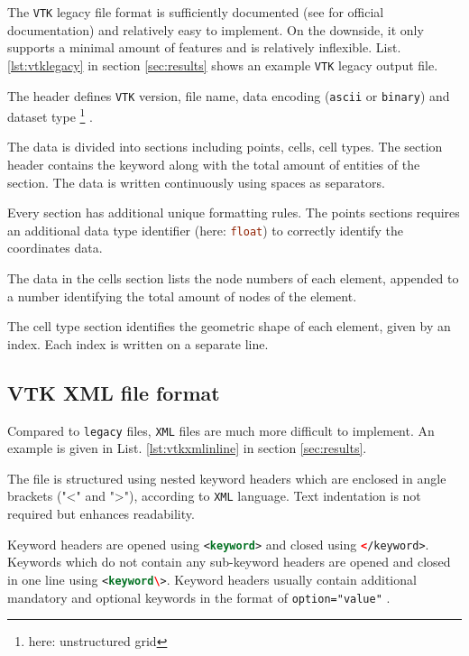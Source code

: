 The \texttt{VTK} legacy file format is sufficiently documented (see \cite{Kit} for official documentation) and relatively easy to implement. On the downside, it only supports a minimal amount of features and is relatively inflexible. List. \ref{lst:vtklegacy} in section \ref{sec:results} shows an example \texttt{VTK} legacy output file. 

\bigbreak
The header defines \texttt{VTK} version, file name, data encoding (\texttt{ascii} or \texttt{binary}) and dataset type \footnote{here: unstructured grid} \cite{Kit}.

\bigbreak
The data is divided into sections including points, cells, cell types. The section header contains the keyword along with the total amount of entities of the section. The data is written continuously using spaces as separators. \cite{Kit}

\bigbreak
Every section has additional unique formatting rules. The points sections requires an additional data type identifier (here: \lstinline[language=C]{float}) to correctly identify the coordinates data. \cite{Kit}

\bigbreak
The data in the cells section lists the node numbers of each element, appended to a number identifying the total amount of nodes of the element. \cite{Kit}

\bigbreak
The cell type section identifies the geometric shape of each element, given by an index. Each index is written on a separate line. \cite{Kit}

\subsection{VTK XML file format}
\label{subsec:VTKXMLfileformat}

Compared to \texttt{legacy} files, \texttt{XML} files are much more difficult to implement. An example is given in List. \ref{lst:vtkxmlinline} in section \ref{sec:results}. 

\bigbreak
The file is structured using nested keyword headers which are enclosed in angle brackets ("<" and ">"), according to \texttt{XML} language. Text indentation is not required but enhances readability.

\bigbreak
Keyword headers are opened using \lstinline[language=XML]{<keyword>} and closed using \lstinline[language=XML]{</keyword>}. Keywords which do not contain any sub-keyword headers are opened and closed in one line using \lstinline[language=XML]{<keyword\>}. Keyword headers usually contain additional mandatory and optional keywords in the format of \lstinline[language=XML]{option="value"} \cite{Kit}.

